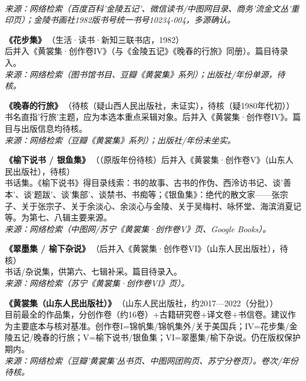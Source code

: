 \documentclass[UTF8,fontset=none,zihao=-4,a4paper]{ctexart}
\begin{document}
\\{\small\itshape 来源：网络检索（百度百科'金陵五记'、微信读书/中图网目录、商务'流金文丛'重印页）；金陵书画社1982版书号统一书号10234-004，多源确认。}
\par\vspace{5pt}
\noindent\textbf{《花步集》}\,{\small（生活·读书·新知三联书店，1982）}\\
后并入《黄裳集·创作卷IV》（与《金陵五记》《晚春的行旅》同册）。篇目待录入。
\\{\small\itshape 来源：网络检索（图书馆书目、豆瓣《黄裳集》系列）；出版社/年份单源，待核。}
\par\vspace{5pt}
\noindent\textbf{《晚春的行旅》}\,{\small（待核（疑山西人民出版社，未证实），待核（疑1980年代初））}\\
书名直指'行旅'主题，应为本选本重点采辑对象。后并入《黄裳集·创作卷IV》。篇目与出版信息均待核。
\\{\small\itshape 来源：网络检索（豆瓣《黄裳集》系列）；出版社/年份未坐实。}
\par\vspace{5pt}
\noindent\textbf{《榆下说书 / 银鱼集》}\,{\small（（原版年份待核）后并入《黄裳集·创作卷V》（山东人民出版社），待核）}\\
书话集。《榆下说书》得目录线索：书的故事、古书的作伪、西泠访书记、谈'善本'、谈'题跋'、谈'集部'、谈禁书、书痴等；《银鱼集》：绝代的散文家——张宗子、关于张宗子、关于余淡心、余淡心与金陵、关于吴梅村、咏怀堂、海滨消夏记等。为第七、八辑主要来源。
\\{\small\itshape 来源：网络检索（中图网/苏宁《黄裳集·创作卷V》页、Google Books）。}
\par\vspace{5pt}
\noindent\textbf{《翠墨集 / 榆下杂说》}\,{\small（后并入《黄裳集·创作卷VI》（山东人民出版社），待核）}\\
书话/杂说集，供第六、七辑补采。篇目待录入。
\\{\small\itshape 来源：网络检索（苏宁《黄裳集·创作卷VI》页）。}
\par\vspace{5pt}
\noindent\textbf{《黄裳集（山东人民出版社）》}\,{\small（山东人民出版社，约2017—2022（分批））}\\
目前最全的作品集，分创作卷（约16卷）+古籍研究卷+译文卷+书信卷。建议作为主要底本与核对基准。创作卷I=锦帆集/锦帆集外/关于美国兵；IV=花步集/金陵五记/晚春的行旅；V=榆下说书/银鱼集；VI=翠墨集/榆下杂说。仍在版权保护期内。
\\{\small\itshape 来源：网络检索（豆瓣'黄裳集'丛书页、中图网团购页、苏宁分卷页）。卷次/年份待核。}
\par\vspace{5pt}
\end{document}
